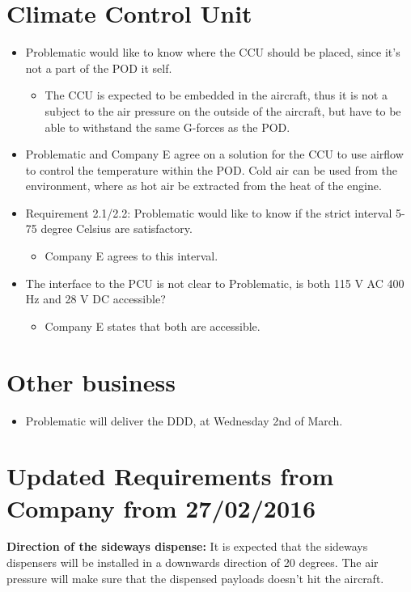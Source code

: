 \section*{Climate Control Unit}
\begin{itemize}
    \item Problematic would like to know where the CCU should be placed, since it's not a part of the POD it self.
    \begin{itemize}
        \item The CCU is expected to be embedded in the aircraft, thus it is not a subject to the air pressure on the outside of the aircraft, but have to be able to withstand the same G-forces as the POD. 
    \end{itemize}
    \item Problematic and Company E agree on a solution for the CCU to use airflow to control the temperature within the POD. Cold air can be used from the environment, where as hot air be extracted from the heat of the engine.
    \item Requirement 2.1/2.2: Problematic would like to know if the strict interval 5-75 degree Celsius are satisfactory.
    \begin{itemize}
        \item Company E agrees to this interval.
   \end{itemize} 
   \item The interface to the PCU is not clear to Problematic, is both 115 V AC 400 Hz and 28 V DC accessible?
   \begin{itemize}
       \item Company E states that both are accessible.
    \end{itemize}
\end{itemize}


\section*{Other business}
\begin{itemize}
    \item Problematic will deliver the DDD, at Wednesday 2nd of March.
\end{itemize}

\section*{Updated Requirements from Company from 27/02/2016}
\textbf{Direction of the sideways dispense:} It is expected that the sideways dispensers will be installed in a downwards direction of 20 degrees. The air pressure will make sure that the dispensed payloads doesn’t hit the aircraft.

